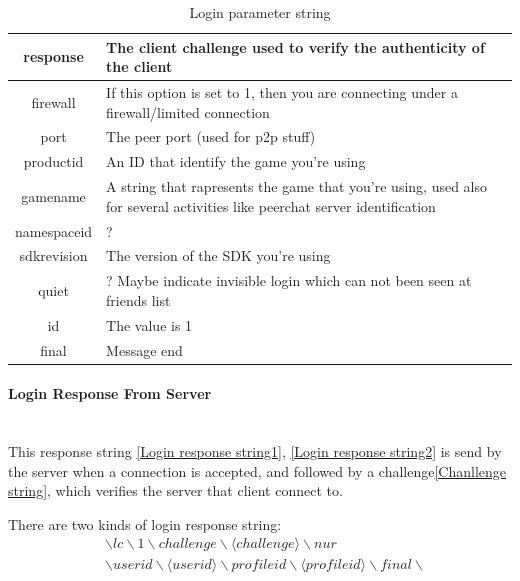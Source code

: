\documentclass[oneside,titlepage,a4paper]{report} %
\begin{document}
\begin{table}[H]
\begin{tabular}{|c|>{\centering\arraybackslash}p{9cm}|}
		 response   & The client challenge used to verify the authenticity of the client                                                                                                                                        \\ \hline
		 firewall   & If this option is set to 1, then you are connecting under a firewall/limited connection \\
		 \hline
		 port& The peer port (used for p2p stuff)                                                                          \\ \hline
		 productid  & An ID that identify the game you're using                                                                                                                                                                 \\ \hline
		 gamename   & A string that rapresents the game that you're using, used also for several activities like peerchat server identification                                                                                 \\ \hline
		
		namespaceid & ?                                                                                                                                                                                                         \\ \hline
		sdkrevision & The version of the SDK you're using \\ \hline
		   quiet    & ? Maybe indicate invisible login which can not been seen at friends list \\ \hline
		   id& The value is 1\\ \hline
		   final & Message end\\ \hline
	\end{tabular} 
	\caption{Login parameter string}
	\label{Login parameter string}
\end{table}
\paragraph{Login Response From Server}\mbox{}\\

This response string \ref{Login response string1}, \ref{Login response string2} is send by the server when a connection is accepted, and followed by a challenge\ref{Chanllenge string}, which verifies the server that client connect to.
\par There are two kinds of login response string: 
\begin{equation}\label{Login response string1}
\begin{split}
&\backslash lc \backslash 1 \backslash challenge \backslash \langle challenge \rangle \backslash nur \\&\backslash userid \backslash \langle userid \rangle \backslash profileid \backslash \langle profileid \rangle \backslash final \backslash
\end{split}	
\end{equation}
\end{document}
